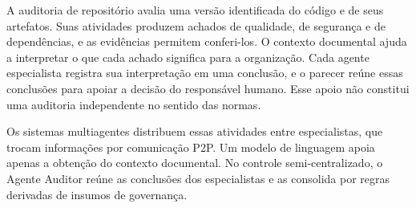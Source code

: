 A auditoria de repositório avalia uma versão identificada do código e de seus artefatos. Suas atividades produzem achados de qualidade, de segurança e de dependências, e as evidências permitem conferi-los. O contexto documental ajuda a interpretar o que cada achado significa para a organização. Cada agente especialista registra sua interpretação em uma conclusão, e o parecer reúne essas conclusões para apoiar a decisão do responsável humano. Esse apoio não constitui uma auditoria independente no sentido das normas.

Os sistemas multiagentes distribuem essas atividades entre especialistas, que trocam informações por comunicação P2P. Um modelo de linguagem apoia apenas a obtenção do contexto documental. No controle semi-centralizado, o Agente Auditor reúne as conclusões dos especialistas e as consolida por regras derivadas de insumos de governança. %